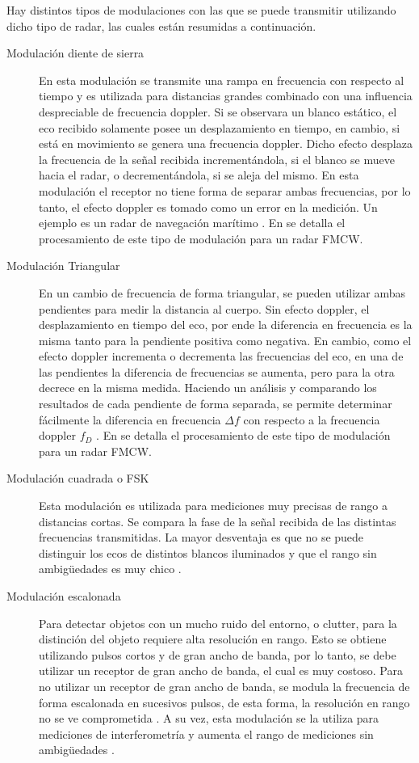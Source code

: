 Hay distintos tipos de modulaciones con las que se puede transmitir utilizando dicho tipo de radar, las cuales están resumidas a continuación.

\begin{description}

\item[Modulación diente de sierra] En esta modulación se transmite una rampa en frecuencia con respecto al tiempo y es utilizada para distancias grandes combinado con una influencia despreciable de frecuencia doppler. Si se observara un blanco estático, el eco recibido solamente posee un desplazamiento en tiempo, en cambio, si está en movimiento se genera una frecuencia doppler. Dicho efecto desplaza la frecuencia de la señal recibida incrementándola, si el blanco se mueve hacia el radar, o decrementándola, si se aleja del mismo. En esta modulación el receptor no tiene forma de separar ambas frecuencias, por lo tanto, el efecto doppler es tomado como un error en la medición. Un ejemplo es un radar de navegación marítimo \cite{Basics2015}. En \cite{Varavin2007a, Shen} se detalla el procesamiento de este tipo de modulación para un radar FMCW.

\item[Modulación Triangular] En un cambio de frecuencia de forma triangular, se pueden utilizar ambas pendientes para medir la distancia al cuerpo. Sin efecto doppler, el desplazamiento en tiempo del eco, por ende la diferencia en frecuencia es la misma tanto para la pendiente positiva como negativa. En cambio, como el efecto doppler incrementa o decrementa las frecuencias del eco, en una de las pendientes la diferencia de frecuencias se aumenta, pero para la otra decrece en la misma medida. Haciendo un análisis y comparando los resultados de cada pendiente de forma separada, se permite determinar fácilmente la diferencia en frecuencia $\Delta f$ con respecto a la frecuencia doppler $f_D$ \cite{Basics2015}. En \cite{Chang2006, Kurt2007} se detalla el procesamiento de este tipo de modulación para un radar FMCW.

\item[Modulación cuadrada o FSK] Esta modulación es utilizada para mediciones muy precisas de rango a distancias cortas. Se compara la fase de la señal recibida de las distintas frecuencias transmitidas. La mayor desventaja es que no se puede distinguir los ecos de distintos blancos iluminados y que el rango sin ambigüedades es muy chico \cite{Basics2015}.

\item[Modulación escalonada] Para detectar objetos con un mucho ruido del entorno, o clutter, para la distinción del objeto requiere alta resolución en rango. Esto se obtiene utilizando pulsos cortos y de gran ancho de banda, por lo tanto, se debe utilizar un receptor de gran ancho de banda, el cual es muy costoso. Para no utilizar un receptor de gran ancho de banda, se modula la frecuencia de forma escalonada en sucesivos pulsos, de esta forma, la resolución en rango no se ve comprometida \cite{steppedFreq}. A su vez, esta modulación se la utiliza para mediciones de interferometría y aumenta el rango de mediciones sin ambigüedades \cite{Basics2015}.


\end{description}
